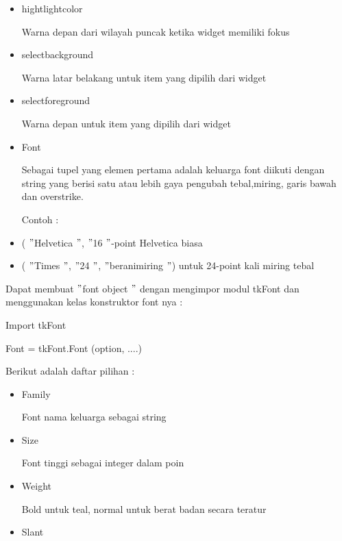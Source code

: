 \begin{itemize}
\begin{itemize}
\noindent 
\item hightlightcolor \par
Warna depan dari wilayah puncak ketika widget memiliki fokus \par
\noindent 
\item selectbackground \par
Warna latar belakang untuk item yang dipilih dari widget \par
\noindent 
\item selectforeground \par
Warna depan untuk item yang dipilih dari widget \par
\noindent 
\item Font \par
\noindent 
Sebagai tupel yang elemen pertama adalah keluarga font diikuti dengan string yang berisi satu atau lebih gaya pengubah tebal,miring, garis bawah dan overstrike. \par
\noindent 
Contoh : \par
\noindent 
\item ( $ " $Helvetica $ " $, $ " $16 $ " $-point Helvetica biasa \par
\noindent 
\item ( $ " $Times $ " $, $ " $24 $ " $, $ " $beranimiring $ " $) untuk 24-point kali miring tebal\end{itemize}
 \par
\vspace{12pt}
Dapat membuat  $ " $font object $ " $ dengan mengimpor modul tkFont dan menggunakan kelas konstruktor font nya : \par
Import tkFont \par
Font = tkFont.Font (option, ....) \par
\vspace{12pt}
Berikut adalah daftar pilihan : \par
\noindent 
\begin{itemize}
\item Family \par
Font nama keluarga sebagai string \par
\noindent 
\item Size \par
Font tinggi sebagai integer dalam poin \par
\noindent 
\item Weight \par
Bold untuk teal, normal untuk berat badan secara teratur \par
\noindent 
\item Slant \par

\end{itemize}
\end{itemize}
